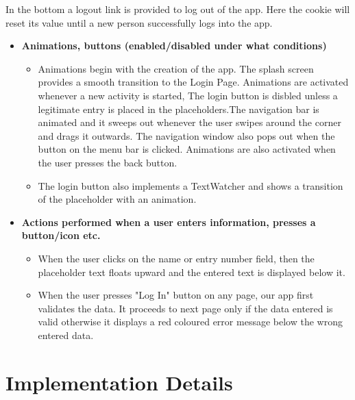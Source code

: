 \documentclass[12pt]{article}
\begin{document}
\begin{itemize}
    In the bottom a logout link is provided to log out of the app. Here the cookie will reset its value until a new person successfully logs into the app.
    \end{itemize}
    
    
    
    \begin{itemize}
    

\item \textbf{\large Animations, buttons (enabled/disabled under what conditions)}
    \begin{itemize}
    
    \item 
        Animations begin with the creation of the app. The splash screen provides a smooth transition to the Login Page. Animations are activated whenever a new activity is started, The login button is disbled unless a legitimate entry is placed in the placeholders.The navigation bar is animated and it sweeps  out whenever the user swipes around the corner and drags it outwards. The navigation window also pops out when the button on the menu bar is clicked. Animations are also activated when the user presses the back button.
    \item 
       The login button also implements a TextWatcher and shows a transition of the placeholder with an animation.
    \end{itemize}
\item \textbf{\large Actions performed when a user enters information, presses a button/icon etc.}
    \begin{itemize}
    
    \item 
        When the user clicks on the name or entry number field, then the placeholder text floats upward and the entered text is displayed below it.
    \item 
        When the user presses "Log In" button on any page, our app first validates the data. It proceeds to next page only if the data entered is valid otherwise it displays a red coloured error message below the wrong entered data.
    \end{itemize}
    
\end{itemize}

\section{Implementation Details}
\end{document}

